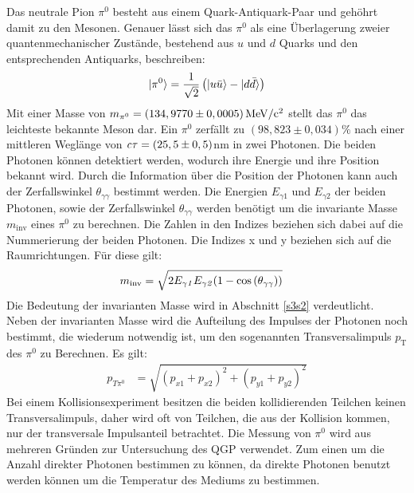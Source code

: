 Das neutrale Pion $\pi^{0}$ besteht aus einem Quark-Antiquark-Paar und geh\"ohrt damit zu den Mesonen.
Genauer l\"asst sich das $\pi^{0}$ als eine \"Uberlagerung zweier quantenmechanischer Zust\"ande, bestehend aus $u$ und $d$ Quarks und den entsprechenden Antiquarks, beschreiben:
\begin{align}
\lvert\pi^{0}\rangle = \frac{1}{\sqrt{2}}\left(\lvert u\bar{u}\rangle-\lvert d\bar{d}\rangle\right) \label{eq:pi0state}
\end{align}
Mit einer Masse von $m_{\pi^{0}} = \left(134,9770\pm0,0005\right) \rm{MeV}/c^{2}$ \cite{book:pdg} stellt das $\pi^{0}$ das leichteste bekannte Meson dar.
Ein ${\pi^{0}}$ zerf{\"a}llt zu $\left( 98,823\pm0,034\right)\%$ nach einer mittleren Wegl\"ange von ${\it c\tau} = (25,5\pm0,5)$nm \cite{book:pdg} in zwei Photonen.
Die beiden Photonen k\"onnen detektiert werden, wodurch ihre Energie und ihre Position bekannt wird.
Durch die Information \"uber die Position der Photonen kann auch der Zerfallswinkel $\theta_{\gamma\gamma}$ bestimmt werden.
Die Energien $E_{\gamma1}$ und $E_{\gamma2}$ der beiden Photonen, sowie der Zerfallswinkel $\theta_{\gamma\gamma}$ werden ben\"otigt um die invariante Masse $m_{\text{inv}}$ eines $\pi^{0}$ zu berechnen.
Die Zahlen in den Indizes beziehen sich dabei auf die Nummerierung der beiden Photonen. Die Indizes x und y beziehen sich auf die Raumrichtungen. F{\"u}r diese gilt:
\begin{align}
m_{\text{inv}} &= \sqrt{2E_{\gamma\it{1}}E_{\gamma\it{2}}(1-\cos\left( \theta_{\gamma\gamma}\right) )} \label{eq_invmass}
\end{align}
Die Bedeutung der invarianten Masse wird in Abschnitt \ref{s3s2} verdeutlicht.
\newline
Neben der invarianten Masse wird die Aufteilung des Impulses der Photonen noch bestimmt, die wiederum notwendig ist, um den sogenannten Transversalimpuls $p_\text{T}$ des $\pi^{0}$ zu Berechnen. Es gilt:
\begin{align}
p_{T\pi^{0}} &= \sqrt{\left(p_{x1}+p_{x2}\right)^{2} +\left(p_{y1}+p_{y2}\right)^{2}} \label{eq_pt}
\end{align}
Bei einem Kollisionsexperiment besitzen die beiden kollidierenden Teilchen keinen Transversalimpuls, daher wird oft von Teilchen, die aus der Kollision kommen, nur der transversale Impulsanteil betrachtet.
\newline
Die Messung von $\pi^{0}$ wird aus mehreren Gr\"unden zur Untersuchung des QGP verwendet.
\newline
Zum einen um die Anzahl direkter Photonen bestimmen zu k\"onnen, da direkte Photonen benutzt werden k\"onnen um die Temperatur des Mediums zu bestimmen.
